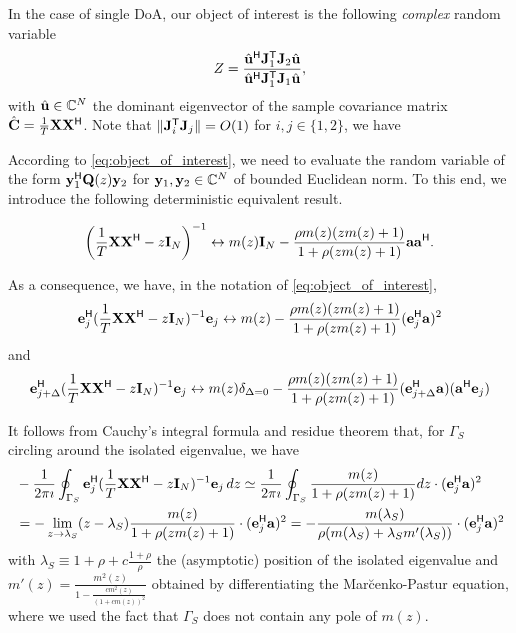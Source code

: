 \documentclass[11pt,a4paper]{article}
\begin{document}
In the case of single DoA, our object of interest is the following \emph{complex} random variable 
\begin{equation}
	Z = \frac{ \hat {\mathbf{u}}^{\sf H} {\mathbf{J}}_1^{\sf T} {\mathbf{J}}_2 \hat {\mathbf{u}} }{\hat {\mathbf{u}}^{\sf H} {\mathbf{J}}_1^{\sf T} {\mathbf{J}}_1 \hat {\mathbf{u}}},
\end{equation}
with $\hat {\mathbf{u}} \in {\mathbb{C}}^{N}$ the dominant eigenvector of the sample covariance matrix $\hat {{\mathbf{C}}} = \frac1T {\mathbf{X}} {\mathbf{X}}^{\sf H}$.
Note that $\| {\mathbf{J}}_i^{\sf T} {\mathbf{J}}_j \| = O(1)$ for $i,j \in \{1,2 \}$, we have

According to \eqref{eq:object_of_interest}, we need to evaluate the random variable of the form $\mathbf{y}_1^{\sf H} {\mathbf{Q}}(z) \mathbf{y}_2$ for $\mathbf{y}_1, \mathbf{y}_2 \in {\mathbb{C}}^N$ of bounded Euclidean norm. To this end, we introduce the following deterministic equivalent result.

\begin{Theorem}\label{theo:DE}
\begin{equation}
	\left(\frac1T {\mathbf{X}} {\mathbf{X}}^{\sf H} - z \mathbf{I}_N \right)^{-1} \leftrightarrow m(z) \mathbf{I}_N - \frac{\rho m(z) (z m(z) + 1)}{1+\rho (z m(z)+1)} \mathbf{a} \mathbf{a}^{\sf H}.
\end{equation}
\end{Theorem}

As a consequence, we have, in the notation of \eqref{eq:object_of_interest},
\begin{equation}
	\mathbf{e}_j^{\sf H} (\frac1T {\mathbf{X}} {\mathbf{X}}^{\sf H} - z \mathbf{I}_N)^{-1} \mathbf{e}_j \leftrightarrow m(z) - \frac{\rho m(z) (z m(z) + 1)}{1+\rho (z m(z)+1)} (\mathbf{e}_j^{\sf H} \mathbf{a})^2 
\end{equation}
and 
\begin{equation}
	\mathbf{e}_{j + \Delta}^{\sf H} (\frac1T {\mathbf{X}} {\mathbf{X}}^{\sf H} - z \mathbf{I}_N)^{-1} \mathbf{e}_j \leftrightarrow m(z) \delta_{\Delta = 0} - \frac{\rho m(z) (z m(z) + 1)}{1+\rho (z m(z)+1)} (\mathbf{e}_{j+\Delta}^{\sf H} \mathbf{a})(\mathbf{a}^{\sf H} \mathbf{e}_j) 
\end{equation}

It follows from Cauchy's integral formula and residue theorem that, for $\Gamma_S$ circling around the isolated eigenvalue, we have
\begin{align*}
	&-\frac1{2\pi \imath} \oint_{\Gamma_S} \mathbf{e}_j^{\sf H} (\frac1T {\mathbf{X}} {\mathbf{X}}^{\sf H} - z \mathbf{I}_N)^{-1} \mathbf{e}_j\,dz \simeq \frac1{2\pi \imath} \oint_{\Gamma_S} \frac{m(z)}{1 + \rho (z m(z) + 1)}dz \cdot (\mathbf{e}_j^{\sf H} \mathbf{a})^2 \\ 
	&= - \lim_{z \to \lambda_S} (z - \lambda_S)\frac{m(z)}{1 + \rho (z m(z) + 1)} \cdot (\mathbf{e}_j^{\sf H} \mathbf{a})^2= -\frac{m(\lambda_S)}{ \rho ( m(\lambda_S) + \lambda_S m'(\lambda_S)) } \cdot (\mathbf{e}_j^{\sf H} \mathbf{a})^2
\end{align*}
with $\lambda_S \equiv 1 + \rho + c \frac{1+\rho}{\rho}$ the (asymptotic) position of the isolated eigenvalue and $m'(z) = \frac{m^2(z)}{ 1 - \frac{c m^2(z)}{ (1+cm(z))^2 }}$ obtained by differentiating the Mar{\u c}enko-Pastur equation, where we used the fact that $\Gamma_S$ does not contain any pole of $m(z)$. 
\end{document}
